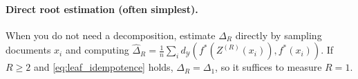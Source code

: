 \documentclass[11pt]{article}
\newcommand{\Y}{\mathcal{Y}}               %
\newcommand{\fstar}{f^*}               %
\newcommand{\E}{\mathbb{E}}
\newcommand{\metric}{d_{\Y}}
\newcommand{\reduce}{\text{Reduce}}
\newcommand{\reduceg}{\reduce_g}
\newcommand{\Eg}{\E_g}     %
\begin{document}
\paragraph{Direct root estimation (often simplest).}
When you do not need a decomposition, estimate $\Delta_R$ directly by sampling documents
$x_i$ and computing $\widehat\Delta_R=\frac1n\sum_i \metric(\fstar(Z^{(R)}(x_i)),\fstar(x_i))$.
If $R\ge2$ and \eqref{eq:leaf_idempotence} holds, $\Delta_R=\Delta_1$, so it suffices to measure $R=1$.



\end{document}

